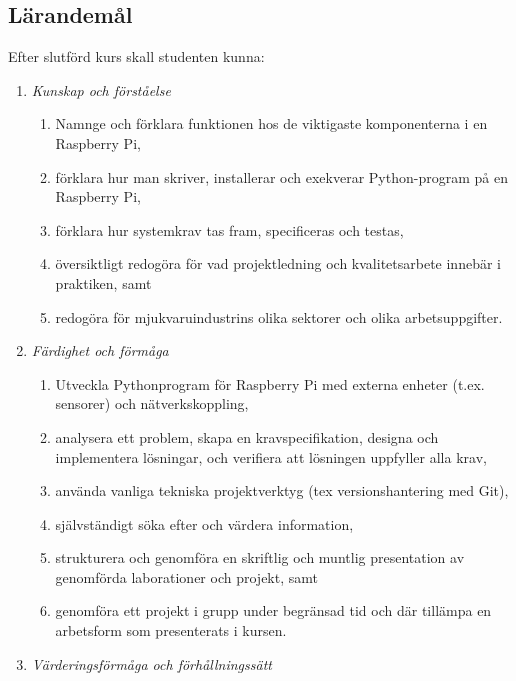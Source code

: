 \subsection*{Lärandemål}

Efter slutförd kurs skall studenten kunna:

\begin{enumerate}
\def\labelenumi{\Alph{enumi}.}
\tightlist
\item
  \emph{Kunskap och förståelse}

  \begin{enumerate}
  \def\labelenumii{\Alph{enumi}.\arabic{enumii}.}
  \tightlist
  \item
    Namnge och förklara funktionen hos de viktigaste komponenterna i en
    Raspberry Pi,
  \item
    förklara hur man skriver, installerar och exekverar Python-program
    på en Raspberry Pi,
  \item
    förklara hur systemkrav tas fram, specificeras och testas,
  \item
    översiktligt redogöra för vad projektledning och kvalitetsarbete
    innebär i praktiken, samt
  \item
    redogöra för mjukvaruindustrins olika sektorer och olika
    arbetsuppgifter.
  \end{enumerate}
\item
  \emph{Färdighet och förmåga}

  \begin{enumerate}
  \def\labelenumii{\Alph{enumi}.\arabic{enumii}.}
  \tightlist
  \item
    Utveckla Pythonprogram för Raspberry Pi med externa enheter (t.ex.
    sensorer) och nätverkskoppling,
  \item
    analysera ett problem, skapa en kravspecifikation, designa och
    implementera lösningar, och verifiera att lösningen uppfyller alla
    krav,
  \item
    använda vanliga tekniska projektverktyg (tex versionshantering med
    Git),
  \item
    självständigt söka efter och värdera information,
  \item
    strukturera och genomföra en skriftlig och muntlig presentation av
    genomförda laborationer och projekt, samt
  \item
    genomföra ett projekt i grupp under begränsad tid och där tillämpa
    en arbetsform som presenterats i kursen.
  \end{enumerate}
\item
  \emph{Värderingsförmåga och förhållningssätt}


\end{enumerate}
